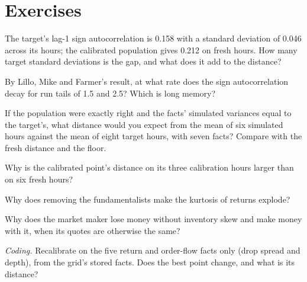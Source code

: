 \section{Exercises}

\begin{exercise}[$\star$]\label{exo:mx:build-an-agent-based-market:1}
The target's lag-1 sign autocorrelation is 0.158 with a standard deviation of 0.046 across its hours; the calibrated population gives 0.212 on fresh
hours. How many target standard deviations is the gap, and what does it add to the distance?
\end{exercise}

\begin{exercise}[$\star$]\label{exo:mx:build-an-agent-based-market:2}
By Lillo, Mike and Farmer's result, at what rate does the sign autocorrelation decay for run tails of 1.5 and 2.5? Which is long memory?
\end{exercise}

\begin{exercise}[$\star$]\label{exo:mx:build-an-agent-based-market:3}
If the population were exactly right and the facts' simulated variances equal to the target's, what distance would you expect from the mean of six
simulated hours against the mean of eight target hours, with seven facts? Compare with the fresh distance and the floor.
\end{exercise}

\begin{exercise}[$\star\star$]\label{exo:mx:build-an-agent-based-market:4}
Why is the calibrated point's distance on its three calibration hours larger than on six fresh hours?
\end{exercise}

\begin{exercise}[$\star\star$]\label{exo:mx:build-an-agent-based-market:5}
Why does removing the fundamentalists make the kurtosis of returns explode?
\end{exercise}

\begin{exercise}[$\star\star$]\label{exo:mx:build-an-agent-based-market:6}
Why does the market maker lose money without inventory skew and make money with it, when its quotes are otherwise the same?
\end{exercise}

\begin{exercise}[$\star\star\star$]\label{exo:mx:build-an-agent-based-market:7}
\emph{Coding.} Recalibrate on the five return and order-flow facts only (drop spread and depth), from the grid's stored facts. Does the best point
change, and what is its distance?
\end{exercise}

